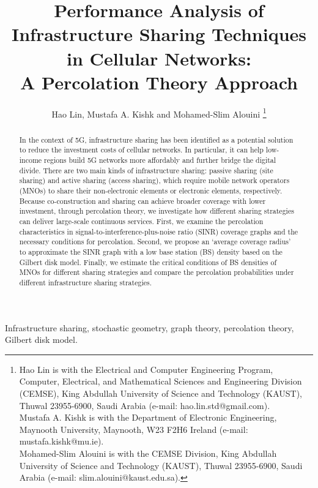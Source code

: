 \documentclass[final]{IEEEtran}
\begin{document}

\graphicspath{{./Figures/}}
\title{
Performance Analysis of Infrastructure Sharing Techniques in Cellular Networks:\\ A Percolation Theory Approach}
\author{
 Hao Lin,  Mustafa A. Kishk and Mohamed-Slim Alouini
\thanks{Hao Lin is with the Electrical and Computer Engineering Program, Computer, Electrical, and Mathematical Sciences and Engineering Division (CEMSE), King Abdullah University of Science and Technology (KAUST),
Thuwal 23955-6900, Saudi Arabia (e-mail: hao.lin.std@gmail.com).\\
\indent Mustafa A. Kishk is with the Department of Electronic Engineering,
Maynooth University, Maynooth, W23 F2H6 Ireland (e-mail:
mustafa.kishk@mu.ie).\\
\indent Mohamed-Slim Alouini is with the CEMSE Division, King Abdullah
University of Science and Technology (KAUST), Thuwal 23955-6900,
Saudi Arabia (e-mail: slim.alouini@kaust.edu.sa).}
}

\maketitle
\vspace{-2cm}
\begin{abstract}
In the context of 5G, infrastructure sharing has been identified as a potential solution to reduce the investment costs of cellular networks. In particular, it can help low-income regions build 5G networks more affordably and further bridge the digital divide. There are two main kinds of infrastructure sharing: passive sharing (\ie site sharing) and active sharing (\ie access sharing), which require mobile network operators (MNOs) to share their non-electronic elements or electronic elements, respectively. Because co-construction and sharing can achieve broader coverage with lower investment, through percolation theory, we investigate how different sharing strategies can deliver large-scale continuous services. First, we examine the percolation characteristics in signal-to-interference-plus-noise ratio (SINR) coverage graphs and the necessary conditions for percolation. Second, we propose an `average coverage radius' to approximate the SINR graph with a low base station (BS) density based on the Gilbert disk model. Finally, we estimate the critical conditions of BS densities of MNOs for different sharing strategies and compare the percolation probabilities under different infrastructure sharing strategies.
\end{abstract}
\begin{IEEEkeywords}
Infrastructure sharing, stochastic geometry, graph theory, percolation theory, Gilbert disk model.
\end{IEEEkeywords}
\end{document}
